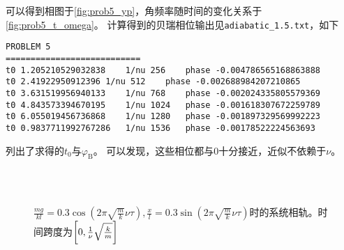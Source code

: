 \documentclass[a4paper,unicode]{report}
\begin{document}
可以得到相图于\autoref{fig:prob5_yp}，角频率随时间的变化关系于\autoref{fig:prob5_t_omega}。
计算得到的贝瑞相位输出见\verb|adiabatic_1.5.txt|，如下
\begin{verbatim}
PROBLEM 5
===========================
t0 1.205210529032838	1/nu 256	phase -0.004786565168863888
t0 2.41922950912396	1/nu 512	phase -0.002688984207210865
t0 3.631519956940133	1/nu 768	phase -0.002024335805579369
t0 4.843573394670195	1/nu 1024	phase -0.001618307672259789
t0 6.055019456736868	1/nu 1280	phase -0.001897329569992223
t0 0.9837711992767286	1/nu 1536	phase -0.00178522224563693
\end{verbatim}
列出了求得的$t_0$与$\varphi_\mathrm{B}$。
可以发现，这些相位都与$0$十分接近，近似不依赖于$\nu$。
\begin{figure}
    \centering
    \\
    \\
    \caption{$\frac{mg}{kl} = 0.3\cos(2\pi \sqrt{\frac{m}{k}}\nu\tau),\frac{x}{l} = 0.3\sin(2\pi \sqrt{\frac{m}{k}}\nu\tau)$时的系统相轨。时间跨度为$\qty[0, \frac{1}{\nu}\sqrt{\frac{k}{m}}]$}
    \label{fig:prob5_yp}
\end{figure}
\end{document}

